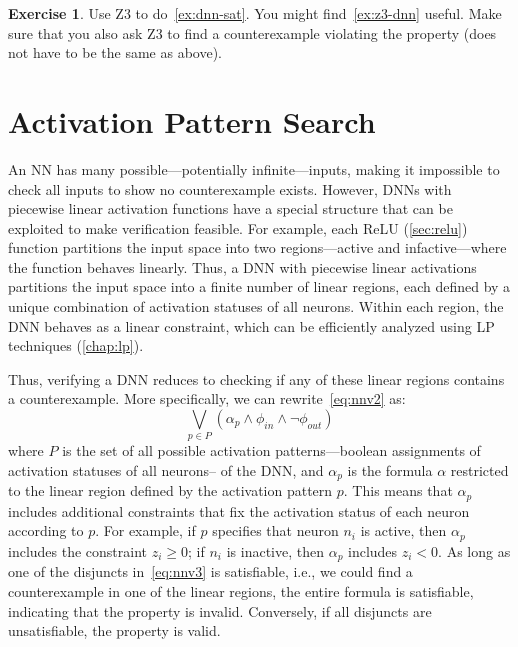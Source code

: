 \documentclass[oneside,11pt,dvipsnames]{book}
\numberwithin{equation}{section}
\theoremstyle{definition}
\newtheorem{exercise}{Exercise}[section]
\theoremstyle{remark}
\begin{document}
\begin{exercise}\label{exercise:z3-dnn}
Use Z3 to do~\autoref{ex:dnn-sat}. You might find~\autoref{ex:z3-dnn} useful.  Make sure that you also ask Z3 to  find a counterexample violating the property (does not have to be the same as above).
\end{exercise}

\section{Activation Pattern Search}\label{sec:activation-pattern}

An NN has many possible---potentially infinite---inputs, making it impossible to check all inputs to show no counterexample exists. However, DNNs with piecewise linear activation functions have a special structure that can be exploited to make verification feasible. 
For example, each ReLU (\autoref{sec:relu}) function partitions the input space into two regions---active and infactive---where the function behaves linearly. 
Thus, a DNN with piecewise linear activations partitions the input space into a finite number of linear regions, each defined by a unique combination of activation statuses of all neurons. 
Within each region, the DNN behaves as a linear constraint, which can be efficiently analyzed using LP techniques (\autoref{chap:lp}).

Thus, verifying a DNN reduces to checking if any of these linear regions contains a counterexample. More specifically, we can rewrite~\autoref{eq:nnv2} as:
\begin{equation}\label{eq:nnv3}
  \bigvee_{p \in P} \left( \alpha_p \land \phi_{in} \land \neg \phi_{out} \right)
\end{equation}
where $P$ is the set of all possible activation patterns---boolean assignments of activation statuses of all neurons--
of the DNN, and $\alpha_p$ is the formula $\alpha$ restricted to the linear region defined by the activation pattern $p$. This means that $\alpha_p$ includes additional constraints that fix the activation status of each neuron according to $p$. For example, if $p$ specifies that neuron $n_i$ is active, then $\alpha_p$ includes the constraint $z_i \ge 0$; if $n_i$ is inactive, then $\alpha_p$ includes $z_i < 0$.
As long as one of the disjuncts in~\autoref{eq:nnv3} is satisfiable, i.e., we could find a counterexample in one of the linear regions, the entire formula is satisfiable, indicating that the property is invalid. Conversely, if all disjuncts are unsatisfiable, the property is valid.
\end{document}
